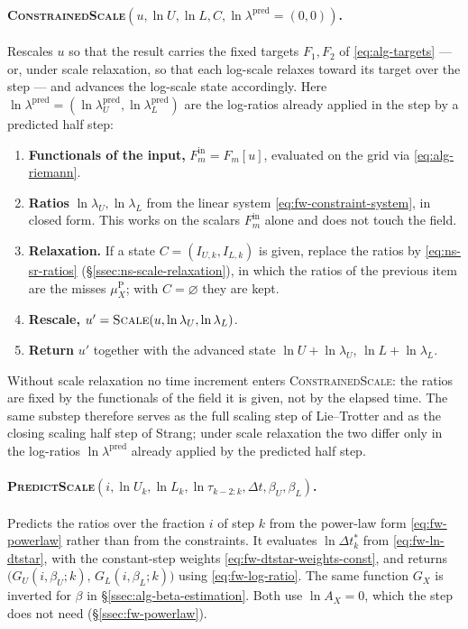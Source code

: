\documentclass{article}
\begin{document}
\paragraph{\textsc{ConstrainedScale}$(u, \ln U, \ln L, C, \ln \lambda^{\mathrm{pred}} = (0, 0))$.}
Rescales $u$ so that the result carries the fixed targets $F_1, F_2$ of
\eqref{eq:alg-targets} --- or, under scale relaxation, so that each log-scale
relaxes toward its target over the step --- and advances the log-scale state
accordingly. Here
$\ln \lambda^{\mathrm{pred}} = (\ln \lambda_U^{\mathrm{pred}}, \ln \lambda_L^{\mathrm{pred}})$
are the log-ratios already applied in the step by a predicted half step:
\begin{enumerate}
  \item \textbf{Functionals of the input,}
  $F_m^{\mathrm{in}} = F_m[u]$, evaluated on the grid via
  \eqref{eq:alg-riemann}.
  \item \textbf{Ratios} $\ln \lambda_U, \ln \lambda_L$ from the linear system
  \eqref{eq:fw-constraint-system}, in closed form. This works on the scalars
  $F_m^{\mathrm{in}}$ alone and does not touch the field.
  \item \textbf{Relaxation.} If a state $C = (I_{U,k}, I_{L,k})$ is given,
  replace the ratios by \eqref{eq:ns-sr-ratios}
  (\S\ref{ssec:ns-scale-relaxation}), in which the ratios of the previous
  item are the misses $\mu_X^{\mathrm{P}}$; with $C = \varnothing$ they are
  kept.
  \item \textbf{Rescale,} $u' = \textsc{Scale}(u, \ln \lambda_U, \ln \lambda_L)$.
  \item \textbf{Return} $u'$ together with the advanced state
  $\ln U + \ln \lambda_U$, $\ln L + \ln \lambda_L$.
\end{enumerate}
Without scale relaxation no time increment enters \textsc{ConstrainedScale}:
the ratios are fixed by the functionals of the field it is given, not by the
elapsed time. The same substep therefore serves as the full scaling step of
Lie--Trotter and as the closing scaling half step of Strang; under scale
relaxation the two differ only in the log-ratios $\ln \lambda^{\mathrm{pred}}$
already applied by the predicted half step.

\paragraph{\textsc{PredictScale}$(i, \ln U_k, \ln L_k, \ln \tau_{k-2:k}, \Delta t, \beta_U, \beta_L)$.}
Predicts the ratios over the fraction $i$ of step $k$ from the power-law form
\eqref{eq:fw-powerlaw} rather than from the constraints. It evaluates
$\ln \Delta t_k^*$ from \eqref{eq:fw-ln-dtstar}, with the constant-step
weights \eqref{eq:fw-dtstar-weights-const}, and returns
$\bigl(G_U(i, \beta_U; k),\, G_L(i, \beta_L; k)\bigr)$ using \eqref{eq:fw-log-ratio}.
The same function $G_X$ is inverted for $\beta$ in
\S\ref{ssec:alg-beta-estimation}. Both use $\ln A_X = 0$, which the step
does not need (\S\ref{ssec:fw-powerlaw}).
\end{document}
